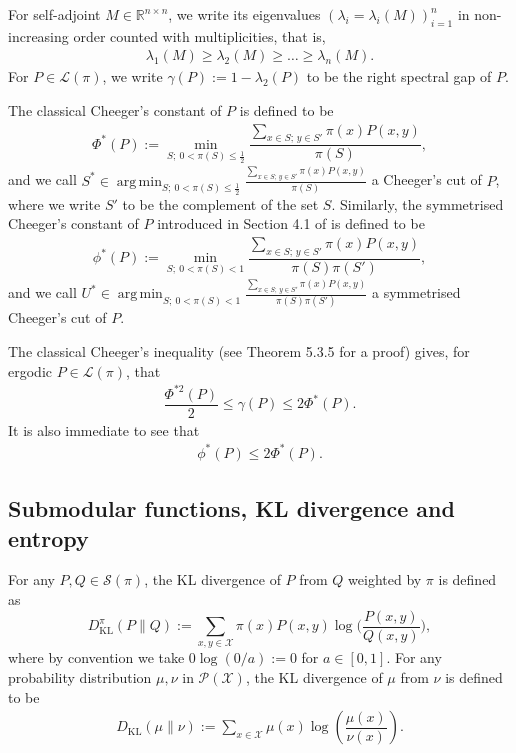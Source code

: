 \documentclass[EJP]{ejpecp} %
\DeclareMathOperator*{\argmin}{arg\,min}
\begin{document}
For self-adjoint $M \in \mathbb{R}^{n \times n}$, we write its eigenvalues $(\lambda_i = \lambda_i(M))_{i=1}^n$ in non-increasing order counted with multiplicities, that is,
\begin{align*}
    \lambda_1(M) \geq \lambda_2(M) \geq \ldots \geq \lambda_n(M).
\end{align*}
For $P \in \mathcal{L}(\pi)$, we write $\gamma(P) := 1 - \lambda_2(P)$ to be the right spectral gap of $P$.

The classical Cheeger's constant of $P$ is defined to be
\begin{align*}
    \Phi^*(P) := \min_{S;~0 < \pi(S) \leq \frac{1}{2}} \dfrac{\sum_{x \in S;\,y \in S'} \pi(x)P(x,y)}{\pi(S)},
\end{align*}
and we call $S^* \in \argmin_{S;~0 < \pi(S) \leq \frac{1}{2}} \frac{\sum_{x \in S;\,y \in S'} \pi(x)P(x,y)}{\pi(S)}$ a Cheeger's cut of $P$, where we write $S'$ to be the complement of the set $S$. Similarly, the symmetrised Cheeger's constant of $P$ introduced in Section 4.1 of \cite{Montenegro} is defined to be
\begin{align*}
    \phi^*(P) := \min_{S;~0 < \pi(S) < 1} \dfrac{\sum_{x \in S;\,y \in S'} \pi(x)P(x,y)}{\pi(S)\pi(S')},
\end{align*}
and we call $U^* \in \argmin_{S;~0 < \pi(S) < 1} \frac{\sum_{x \in S;\,y \in S'} \pi(x)P(x,y)}{\pi(S)\pi(S')}$ a symmetrised Cheeger's cut of $P$. 

The classical Cheeger's inequality (see \cite{roch_mdp_2024} Theorem 5.3.5 for a proof) gives, for ergodic $P \in \mathcal{L}(\pi)$, that
\begin{align}\label{eq:Cheegerineq}
    \dfrac{\Phi^{*2}(P)}{2} \leq \gamma(P) \leq 2 \Phi^*(P).
\end{align}
It is also immediate to see that
\begin{align*}
    \phi^*(P) \leq 2 \Phi^*(P).
\end{align*}

\subsection{Submodular functions, KL divergence and entropy}

For any $P, Q \in \mathcal{S}(\pi)$, the KL divergence of $P$ from $Q$ weighted by $\pi$ is defined as
\begin{equation*}
    D_{\mathrm{KL}}^\pi (P \| Q) := \sum_{x,y \in \mathcal{X}} \pi(x) P(x,y) \log\bigg(\frac{P(x,y)}{Q(x,y)}\bigg),
\end{equation*}
where by convention we take $0 \log (0/a) := 0$ for $a \in [0,1]$. For any probability distribution $\mu, \nu$ in $\mathcal{P}(\mathcal{X})$, the KL divergence of $\mu$ from $\nu$ is defined to be
\begin{align*}
    D_{\mathrm{KL}}(\mu \| \nu) := \sum_{x \in \mathcal{X}} \mu(x) \log \left(\dfrac{\mu(x)}{\nu(x)}\right).
\end{align*}
\end{document}
